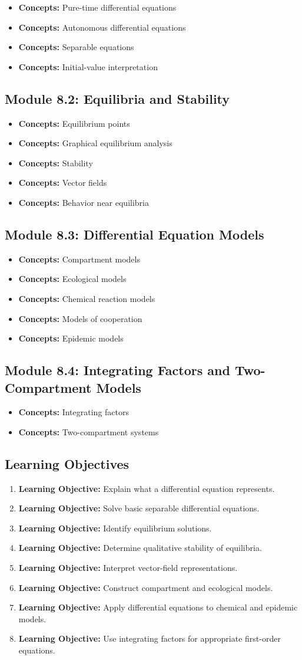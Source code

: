 \documentclass[11pt]{article}
\newcommand{\objective}[1]{\item \textbf{Learning Objective:} #1}
\newcommand{\concept}[1]{\item \textbf{Concepts:} #1}
\begin{document}
\begin{itemize}
    \concept{Pure-time differential equations}
    \concept{Autonomous differential equations}
    \concept{Separable equations}
    \concept{Initial-value interpretation}
\end{itemize}

\subsection{Module 8.2: Equilibria and Stability}

\begin{itemize}
    \concept{Equilibrium points}
    \concept{Graphical equilibrium analysis}
    \concept{Stability}
    \concept{Vector fields}
    \concept{Behavior near equilibria}
\end{itemize}

\subsection{Module 8.3: Differential Equation Models}

\begin{itemize}
    \concept{Compartment models}
    \concept{Ecological models}
    \concept{Chemical reaction models}
    \concept{Models of cooperation}
    \concept{Epidemic models}
\end{itemize}

\subsection{Module 8.4: Integrating Factors and Two-Compartment Models}

\begin{itemize}
    \concept{Integrating factors}
    \concept{Two-compartment systems}
\end{itemize}

\subsection{Learning Objectives}

\begin{enumerate}
    \objective{Explain what a differential equation represents.}
    \objective{Solve basic separable differential equations.}
    \objective{Identify equilibrium solutions.}
    \objective{Determine qualitative stability of equilibria.}
    \objective{Interpret vector-field representations.}
    \objective{Construct compartment and ecological models.}
    \objective{Apply differential equations to chemical and epidemic models.}
    \objective{Use integrating factors for appropriate first-order equations.}
\end{enumerate}
\end{document}
